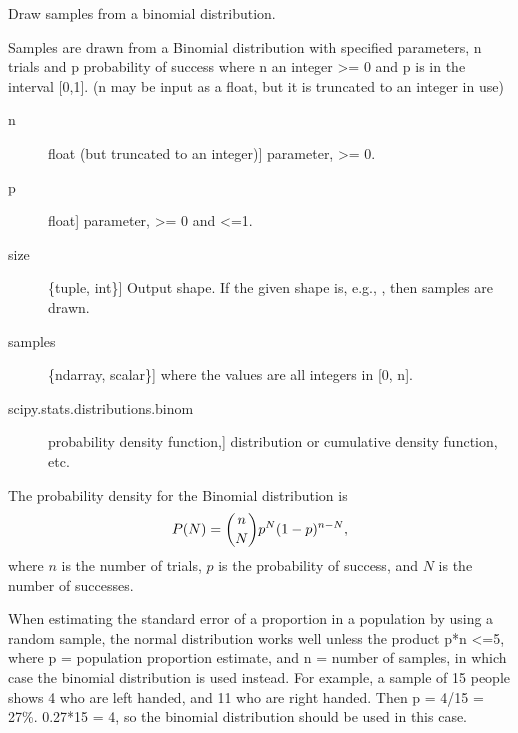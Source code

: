 \documentclass[letterpaper,10pt,english]{sphinxmanual}
\begin{document}
\begin{fulllineitems}
\label{pygeomod:pygeomod.geomodeller_xml_obj.binomial}
Draw samples from a binomial distribution.

Samples are drawn from a Binomial distribution with specified
parameters, n trials and p probability of success where
n an integer \textgreater{}= 0 and p is in the interval {[}0,1{]}. (n may be
input as a float, but it is truncated to an integer in use)
\begin{description}
\item[{n}] \leavevmode{[}float (but truncated to an integer){]}
parameter, \textgreater{}= 0.

\item[{p}] \leavevmode{[}float{]}
parameter, \textgreater{}= 0 and \textless{}=1.

\item[{size}] \leavevmode{[}\{tuple, int\}{]}
Output shape.  If the given shape is, e.g., , then
 samples are drawn.

\end{description}
\begin{description}
\item[{samples}] \leavevmode{[}\{ndarray, scalar\}{]}
where the values are all integers in  {[}0, n{]}.

\end{description}
\begin{description}
\item[{scipy.stats.distributions.binom}] \leavevmode{[}probability density function,{]}
distribution or cumulative density function, etc.

\end{description}

The probability density for the Binomial distribution is
\begin{gather}
\begin{split}P(N) = \binom{n}{N}p^N(1-p)^{n-N},\end{split}\notag
\end{gather}
where \(n\) is the number of trials, \(p\) is the probability
of success, and \(N\) is the number of successes.

When estimating the standard error of a proportion in a population by
using a random sample, the normal distribution works well unless the
product p*n \textless{}=5, where p = population proportion estimate, and n =
number of samples, in which case the binomial distribution is used
instead. For example, a sample of 15 people shows 4 who are left
handed, and 11 who are right handed. Then p = 4/15 = 27\%. 0.27*15 = 4,
so the binomial distribution should be used in this case.


\end{fulllineitems}
\end{document}
